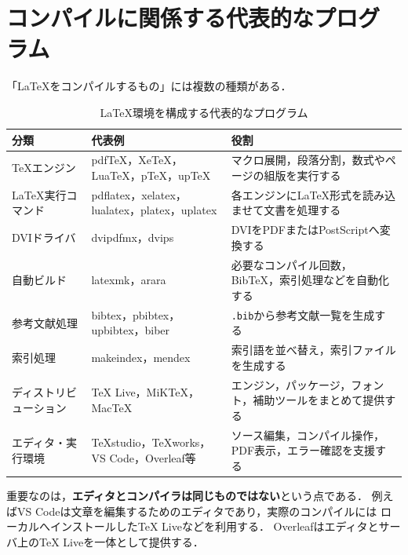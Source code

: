 \documentclass[a4paper,11pt]{jsarticle}
\newcommand{\code}[1]{\texttt{#1}}
\begin{document}
\clearpage
\section{コンパイルに関係する代表的なプログラム}

「LaTeXをコンパイルするもの」には複数の種類がある．

\begin{table}[H]
  \centering
  \small
  \caption{LaTeX環境を構成する代表的なプログラム}
  \begin{tabular}{|>{\raggedright\arraybackslash}p{28mm}
                  |>{\raggedright\arraybackslash}p{48mm}
                  |>{\raggedright\arraybackslash}p{64mm}|}
    \hline
    分類 & 代表例 & 役割 \\
    \hline
    TeXエンジン & pdfTeX，XeTeX，LuaTeX，pTeX，upTeX & マクロ展開，段落分割，数式やページの組版を実行する \\
    \hline
    LaTeX実行コマンド & pdflatex，xelatex，lualatex，platex，uplatex & 各エンジンにLaTeX形式を読み込ませて文書を処理する \\
    \hline
    DVIドライバ & dvipdfmx，dvips & DVIをPDFまたはPostScriptへ変換する \\
    \hline
    自動ビルド & latexmk，arara & 必要なコンパイル回数，BibTeX，索引処理などを自動化する \\
    \hline
    参考文献処理 & bibtex，pbibtex，upbibtex，biber & \code{.bib}から参考文献一覧を生成する \\
    \hline
    索引処理 & makeindex，mendex & 索引語を並べ替え，索引ファイルを生成する \\
    \hline
    ディストリビューション & TeX Live，MiKTeX，MacTeX & エンジン，パッケージ，フォント，補助ツールをまとめて提供する \\
    \hline
    エディタ・実行環境 & TeXstudio，TeXworks，VS Code，Overleaf等 & ソース編集，コンパイル操作，PDF表示，エラー確認を支援する \\
    \hline
  \end{tabular}
\end{table}

重要なのは，\textbf{エディタとコンパイラは同じものではない}という点である．
例えばVS Codeは文章を編集するためのエディタであり，実際のコンパイルには
ローカルへインストールしたTeX Liveなどを利用する．
Overleafはエディタとサーバ上のTeX Liveを一体として提供する\cite{overleaf-compiler}．
\end{document}
